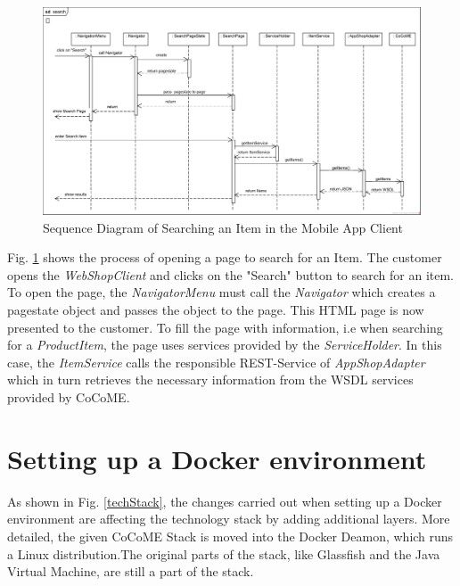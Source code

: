 \begin{figure}[!h]
	\includegraphics[width=\textwidth]{img/appSearchSequence.png}
	\caption{Sequence Diagram of Searching an Item in the Mobile App Client}
	\label{SequenceApp}
\end{figure}

Fig. \ref{SequenceApp} shows the process of opening a page to search for an Item. The customer opens the \textit{WebShopClient} and clicks on the "Search" button to search for an item. To open the page, the \textit{NavigatorMenu} must call the \textit{Navigator} which creates a pagestate object and passes the object to the page. This HTML page is now presented to the customer. To fill the page with information, i.e when searching for a \textit{ProductItem}, the page uses services provided by the \textit{ServiceHolder}. In this case, the \textit{ItemService} calls the responsible REST-Service of \textit{AppShopAdapter} which in turn retrieves the necessary information from the WSDL services provided by CoCoME.




\section{Setting up a Docker environment} \label{Docker}

As shown in Fig. \ref{techStack}, the changes carried out when setting up a Docker environment are affecting the technology stack by adding additional layers. More detailed, the given CoCoME Stack is moved into the Docker Deamon, which runs a Linux distribution.The original parts of the stack, like Glassfish and the Java Virtual Machine, are still a part of the stack.
	
